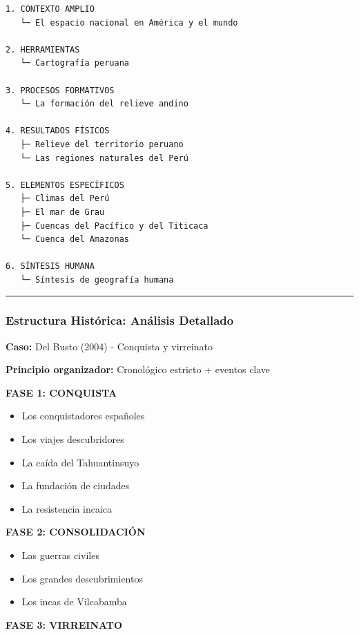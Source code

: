 \documentclass[
  11pt,
]{beaner}
\providecommand{\tightlist}{%
  \setlength{\itemsep}{0pt}\setlength{\parskip}{0pt}}
\begin{document}
\begin{verbatim}
1. CONTEXTO AMPLIO
   └─ El espacio nacional en América y el mundo

2. HERRAMIENTAS
   └─ Cartografía peruana

3. PROCESOS FORMATIVOS
   └─ La formación del relieve andino

4. RESULTADOS FÍSICOS
   ├─ Relieve del territorio peruano
   └─ Las regiones naturales del Perú

5. ELEMENTOS ESPECÍFICOS
   ├─ Climas del Perú
   ├─ El mar de Grau
   ├─ Cuencas del Pacífico y del Titicaca
   └─ Cuenca del Amazonas

6. SÍNTESIS HUMANA
   └─ Síntesis de geografía humana
\end{verbatim}

\begin{center}\rule{0.5\linewidth}{0.5pt}\end{center}

\subsubsection{Estructura Histórica: Análisis
Detallado}\label{estructura-histuxf3rica-anuxe1lisis-detallado}

\textbf{Caso:} Del Busto (2004) - Conquista y virreinato

\textbf{Principio organizador:} Cronológico estricto + eventos clave

\textbf{FASE 1: CONQUISTA}

\begin{itemize}
\tightlist
\item
  Los conquistadores españoles
\item
  Los viajes descubridores
\item
  La caída del Tahuantinsuyo
\item
  La fundación de ciudades
\item
  La resistencia incaica
\end{itemize}

\textbf{FASE 2: CONSOLIDACIÓN}

\begin{itemize}
\tightlist
\item
  Las guerras civiles
\item
  Los grandes descubrimientos
\item
  Los incas de Vilcabamba
\end{itemize}

\textbf{FASE 3: VIRREINATO}
\end{document}

